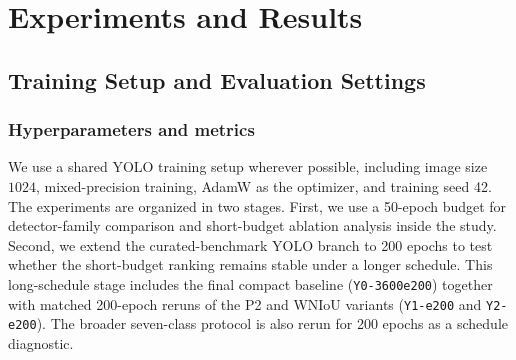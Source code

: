 \documentclass[cmc,article,submit,moreauthors,pdftex]{Definitions/tsp}
\begin{document}



\section{Experiments and Results}
\label{sec:experiments}

\subsection{Training Setup and Evaluation Settings}
\label{sec:training}

\subsubsection{Hyperparameters and metrics}
We use a shared YOLO training setup wherever possible, including image size $1024$, mixed-precision training, AdamW as the optimizer, and training seed 42. The experiments are organized in two stages. First, we use a 50-epoch budget for detector-family comparison and short-budget ablation analysis inside the study. Second, we extend the curated-benchmark YOLO branch to 200 epochs to test whether the short-budget ranking remains stable under a longer schedule. This long-schedule stage includes the final compact baseline (\texttt{Y0-3600e200}) together with matched 200-epoch reruns of the P2 and WNIoU variants (\texttt{Y1-e200} and \texttt{Y2-e200}). The broader seven-class protocol is also rerun for 200 epochs as a schedule diagnostic.
\end{document}
